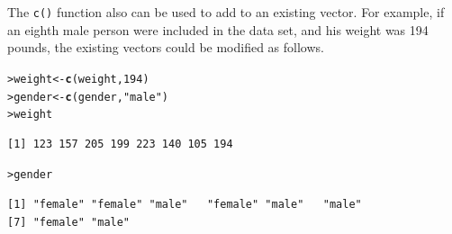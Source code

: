 \documentclass[12pt,oneside]{book}\usepackage[]{graphicx}\usepackage[]{color}
\makeatletter
\newcommand{\hlnum}[1]{\textcolor[rgb]{0.686,0.059,0.569}{#1}}%
\newcommand{\hlstr}[1]{\textcolor[rgb]{0.192,0.494,0.8}{#1}}%
\newcommand{\hlstd}[1]{\textcolor[rgb]{0.345,0.345,0.345}{#1}}%
\newcommand{\hlkwb}[1]{\textcolor[rgb]{0.69,0.353,0.396}{#1}}%
\newcommand{\hlkwd}[1]{\textcolor[rgb]{0.737,0.353,0.396}{\textbf{#1}}}%
\newenvironment{kframe}{%
 \def\at@end@of@kframe{}%
 \ifinner\ifhmode%
  \def\at@end@of@kframe{\end{minipage}}%
  \begin{minipage}{\columnwidth}%
 \fi\fi%
 \def\FrameCommand##1{\hskip\@totalleftmargin \hskip-\fboxsep
 \colorbox{shadecolor}{##1}\hskip-\fboxsep
     \hskip-\linewidth \hskip-\@totalleftmargin \hskip\columnwidth}%
 \MakeFramed {\advance\hsize-\width
   \@totalleftmargin\z@ \linewidth\hsize
   \@setminipage}}%
 {\par\unskip\endMakeFramed%
 \at@end@of@kframe}
\newenvironment{knitrout}{}{} %
\makeatother
\begin{document}
The \verb+c()+ function also can be used to add to an existing vector. For example, if an eighth male person were included in the data set, and his weight was 194 pounds, the existing vectors could be modified as follows.
\begin{knitrout}
\color{fgcolor}\begin{kframe}
\begin{alltt}
\hlstd{> }\hlstd{weight} \hlkwb{<-} \hlkwd{c}\hlstd{(weight,} \hlnum{194}\hlstd{)}
\hlstd{> }\hlstd{gender} \hlkwb{<-} \hlkwd{c}\hlstd{(gender,} \hlstr{"male"}\hlstd{)}
\hlstd{> }\hlstd{weight}
\end{alltt}
\begin{verbatim}
[1] 123 157 205 199 223 140 105 194
\end{verbatim}
\begin{alltt}
\hlstd{> }\hlstd{gender}
\end{alltt}
\begin{verbatim}
[1] "female" "female" "male"   "female" "male"   "male"  
[7] "female" "male"  
\end{verbatim}
\end{kframe}
\end{knitrout}
\end{document}
